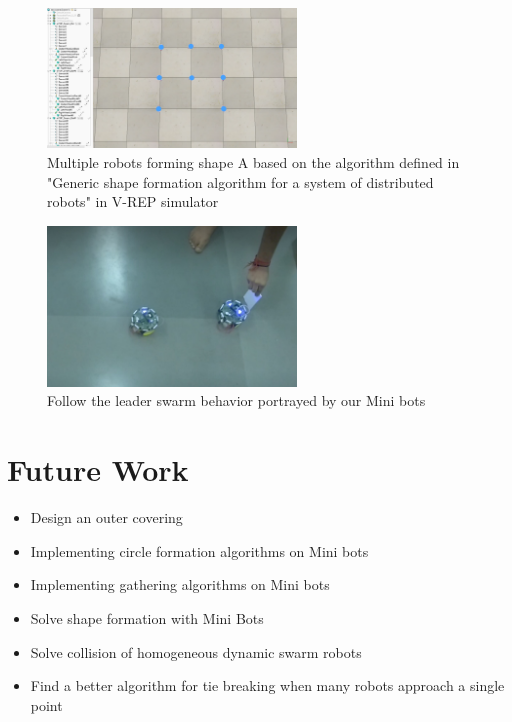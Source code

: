 \documentclass[a4paper,12pt,oneside]{book}
\begin{document}
\begin{figure}[h!]
	\centering\includegraphics[width=250px]{./Pictures/A_shape}		
	\caption{Multiple robots forming shape A based on the algorithm defined in "Generic shape formation algorithm for a system of distributed robots" in V-REP simulator}
\end{figure}

\begin{figure}[h!]
	\centering\includegraphics[width=250px]{./Pictures/Follow_lead}		
	\caption{Follow the leader swarm behavior portrayed by our Mini bots}
\end{figure}	
\newpage
\chapter{Future Work}
\begin{itemize}
	\item Design an outer covering
	\item Implementing circle formation algorithms on Mini bots
	\item Implementing gathering algorithms on Mini bots
	\item Solve shape formation with Mini Bots
	\item Solve collision of homogeneous dynamic swarm robots
	\item Find a better algorithm for tie breaking when many robots approach a single point	
\end{itemize}
\end{document}
